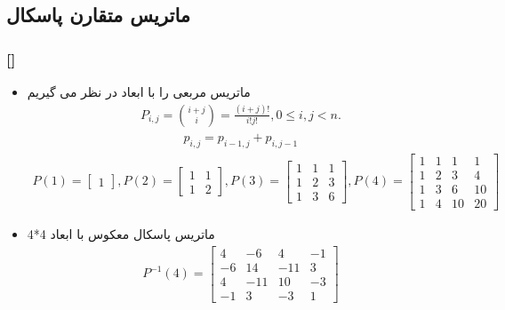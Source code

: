 \documentclass[xcolor=dvipsnames, professionalfonts, 11pt]{beamer}
\newcommand*{\makeframetitle}{\frametitle{\insertsection \hspace{0.1em} {\footnotesize [\insertsubsection]}}}
\begin{document}
\subsection{ماتریس متقارن پاسکال}
\begin{frame}[allowframebreaks]
    \makeframetitle
    \begin{itemize}
        \item ماتریس مربعی  را با ابعاد  در نظر می گیریم
            \begin{align}
                P_{i,j} = \binom{i + j}{i} = \frac{(i + j)!}{i!j!}, 0 \leq i, j < n.
            \end{align}
            \begin{align}
                p_{i,j} = p_{i-1,j} + p_{i,j-1}
            \end{align}
            \framebreak
            {\scriptsize
            \begin{align}
                P(1) = \begin{bmatrix}
                    1
                \end{bmatrix},
                P(2) = \begin{bmatrix}
                    1 & 1\\
                    1 & 2
                \end{bmatrix},
                P(3) = \begin{bmatrix}
                    1 & 1 & 1\\
                    1 & 2 & 3\\
                    1 & 3 & 6
                \end{bmatrix},
                P(4) = \begin{bmatrix}
                    1 & 1 & 1 & 1\\
                    1 & 2 & 3 & 4\\
                    1 & 3 & 6 & 10\\
                    1 & 4 & 10 & 20
                \end{bmatrix}
            \end{align}
            }
            \item  ماتریس پاسکال معکوس با ابعاد 4*4
            \begin{align}
                P^{-1}(4) = \begin{bmatrix}
                    4 & -6 & 4 & -1\\
                    -6 & 14 & -11 & 3\\
                    4 & -11 & 10 & -3\\
                    -1 & 3 & -3 & 1
                \end{bmatrix}
            \end{align}
    \end{itemize}
\end{frame}
\end{document}
